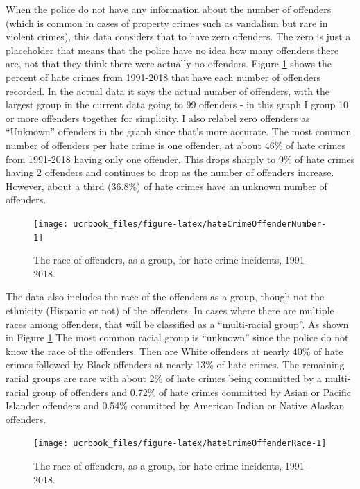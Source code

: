 \documentclass[
  12pt,
  openany]{book}
\begin{document}
When the police do not have any information about the number of offenders (which is common in cases of property crimes such as vandalism but rare in violent crimes), this data considers that to have zero offenders. The zero is just a placeholder that means that the police have no idea how many offenders there are, not that they think there were actually no offenders. Figure \ref{fig:hateCrimeOffenderNumber} shows the percent of hate crimes from 1991-2018 that have each number of offenders recorded. In the actual data it says the actual number of offenders, with the largest group in the current data going to 99 offenders - in this graph I group 10 or more offenders together for simplicity. I also relabel zero offenders as ``Unknown'' offenders in the graph since that's more accurate. The most common number of offenders per hate crime is one offender, at about 46\% of hate crimes from 1991-2018 having only one offender. This drops sharply to 9\% of hate crimes having 2 offenders and continues to drop as the number of offenders increase. However, about a third (36.8\%) of hate crimes have an unknown number of offenders.

\begin{figure}

{\centering \texttt{[image: ucrbook\_files/figure-latex/hateCrimeOffenderNumber-1]} 

}

\caption{The race of offenders, as a group, for hate crime incidents, 1991-2018.}\label{fig:hateCrimeOffenderNumber}
\end{figure}

The data also includes the race of the offenders as a group, though not the ethnicity (Hispanic or not) of the offenders. In cases where there are multiple races among offenders, that will be classified as a ``multi-racial group''. As shown in Figure \ref{fig:hateCrimeOffenderNumber} The most common racial group is ``unknown'' since the police do not know the race of the offenders. Then are White offenders at nearly 40\% of hate crimes followed by Black offenders at nearly 13\% of hate crimes. The remaining racial groups are rare with about 2\% of hate crimes being committed by a multi-racial group of offenders and 0.72\% of hate crimes committed by Asian or Pacific Islander offenders and 0.54\% committed by American Indian or Native Alaskan offenders.

\begin{figure}

{\centering \texttt{[image: ucrbook\_files/figure-latex/hateCrimeOffenderRace-1]} 

}

\caption{The race of offenders, as a group, for hate crime incidents, 1991-2018.}\label{fig:hateCrimeOffenderRace}
\end{figure}

\backmatter

  
\end{document}

